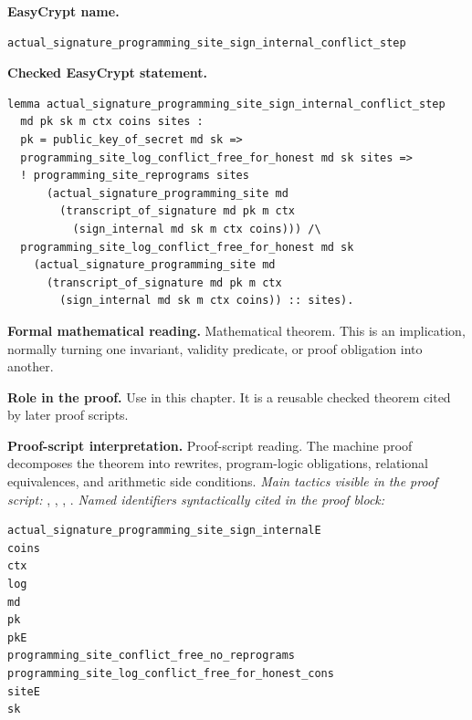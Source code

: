 \begin{formaltheorem}
\noindent\textbf{EasyCrypt name.}
\begin{lstlisting}[language=EasyCrypt,basicstyle=\ttfamily\scriptsize]
actual_signature_programming_site_sign_internal_conflict_step
\end{lstlisting}
\noindent\textbf{Checked EasyCrypt statement.}
\begin{lstlisting}[language=EasyCrypt,basicstyle=\ttfamily\scriptsize]
lemma actual_signature_programming_site_sign_internal_conflict_step
  md pk sk m ctx coins sites :
  pk = public_key_of_secret md sk =>
  programming_site_log_conflict_free_for_honest md sk sites =>
  ! programming_site_reprograms sites
      (actual_signature_programming_site md
        (transcript_of_signature md pk m ctx
          (sign_internal md sk m ctx coins))) /\
  programming_site_log_conflict_free_for_honest md sk
    (actual_signature_programming_site md
      (transcript_of_signature md pk m ctx
        (sign_internal md sk m ctx coins)) :: sites).
\end{lstlisting}
\noindent\textbf{Formal mathematical reading.}
Mathematical theorem. This is an implication, normally turning one invariant, validity predicate, or proof obligation into another.

\noindent\textbf{Role in the proof.}
Use in this chapter. It is a reusable checked theorem cited by later proof scripts.

\noindent\textbf{Proof-script interpretation.}
Proof-script reading. The machine proof decomposes the theorem into rewrites, program-logic obligations, relational equivalences, and arithmetic side conditions.
\emph{Main tactics visible in the proof script:} \ec{have}, \ec{split}, \ec{rewrite}, \ec{apply}.
\emph{Named identifiers syntactically cited in the proof block:}
\begin{lstlisting}[language=EasyCrypt,basicstyle=\ttfamily\scriptsize]
actual_signature_programming_site_sign_internalE
coins
ctx
log
md
pk
pkE
programming_site_conflict_free_no_reprograms
programming_site_log_conflict_free_for_honest_cons
siteE
sk
\end{lstlisting}

\end{formaltheorem}

